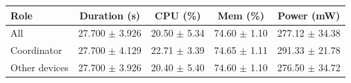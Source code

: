 \begin{tabular}{lcccc}
\hline
\textbf{Role} & \textbf{Duration (s)} & \textbf{CPU (\%)} & \textbf{Mem (\%)} & \textbf{Power (mW)} \\
\hline
All & 27.700 $\pm$ 3.926 & 20.50 $\pm$ 5.34 & 74.60 $\pm$ 1.10 & 277.12 $\pm$ 34.38 \\
Coordinator & 27.700 $\pm$ 4.129 & 22.71 $\pm$ 3.39 & 74.65 $\pm$ 1.11 & 291.33 $\pm$ 21.78 \\
Other devices & 27.700 $\pm$ 3.926 & 20.40 $\pm$ 5.40 & 74.60 $\pm$ 1.10 & 276.50 $\pm$ 34.72 \\
\hline
\end{tabular}
